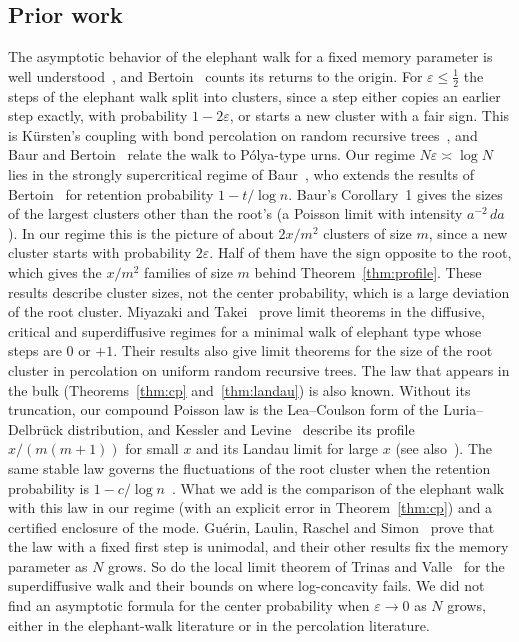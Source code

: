 \subsection{Prior work}\label{sec:prior}

The asymptotic behavior of the elephant walk for a fixed memory parameter is
well understood~\cite{coletti2017,bercu2018,kubotatakei2019}, and
Bertoin~\cite{bertoin2022zeros} counts its returns to the origin. For
$\varepsilon\le\frac12$ the steps of the elephant walk split into clusters, since a step either
copies an earlier step exactly, with probability $1-2\varepsilon$, or starts
a new cluster with a fair sign. This is K\"ursten's coupling with bond
percolation on random recursive trees~\cite{kursten2016}, and Baur and
Bertoin~\cite{baurbertoin2016} relate the walk to P\'olya-type urns. Our
regime $N\varepsilon\asymp\log N$ lies in the strongly supercritical regime
of Baur~\cite{baur2016}, who extends the results of
Bertoin~\cite{bertoin2014} for retention probability $1-t/\log n$. Baur's
Corollary~1 gives the sizes of the largest clusters other than the root's (a
Poisson limit with intensity $a^{-2}\,da$). In our regime this is the picture
of about $2x/m^2$ clusters of size $m$, since a new cluster starts with
probability $2\varepsilon$. Half of them have the sign opposite to the root,
which gives the $x/m^2$ families of size $m$ behind Theorem~\ref{thm:profile}. These results
describe cluster sizes, not the center probability, which is a large deviation
of the root cluster. Miyazaki and Takei~\cite{miyazakitakei2020} prove limit
theorems in the diffusive, critical and superdiffusive regimes for a minimal
walk of elephant type whose steps are $0$ or $+1$. Their results also give
limit theorems for the size of the root cluster in percolation on uniform
random recursive trees. The law that appears in the bulk
(Theorems~\ref{thm:cp} and~\ref{thm:landau}) is also known. Without its
truncation, our compound Poisson law is the Lea--Coulson form of the
Luria--Delbr\"uck distribution, and Kessler and
Levine~\cite[Eqs.~(14), (18) and~(19)]{kesslerlevine2015} describe its profile
$x/(m(m+1))$ for small $x$ and its Landau limit for large $x$ (see
also~\cite{mohle2005}). The same stable law governs the fluctuations of the
root cluster when the retention probability is
$1-c/\log n$~\cite{bertoin2014ejp}. What we add is the comparison of the
elephant walk with this law in our regime (with an explicit error in
Theorem~\ref{thm:cp}) and a certified enclosure of the mode.
Gu\'erin, Laulin, Raschel and Simon~\cite[proof of Theorem~1.1]{glrs2025}
prove that the law with a fixed first step is unimodal, and their other
results fix the memory parameter as $N$ grows. So do the local limit theorem
of Trinas and Valle~\cite[Theorem~3.1]{tv2026} for the superdiffusive walk
and their bounds on where log-concavity fails. We did not find an asymptotic
formula for the center probability when $\varepsilon\to0$ as $N$ grows,
either in the elephant-walk literature or in the percolation literature.

